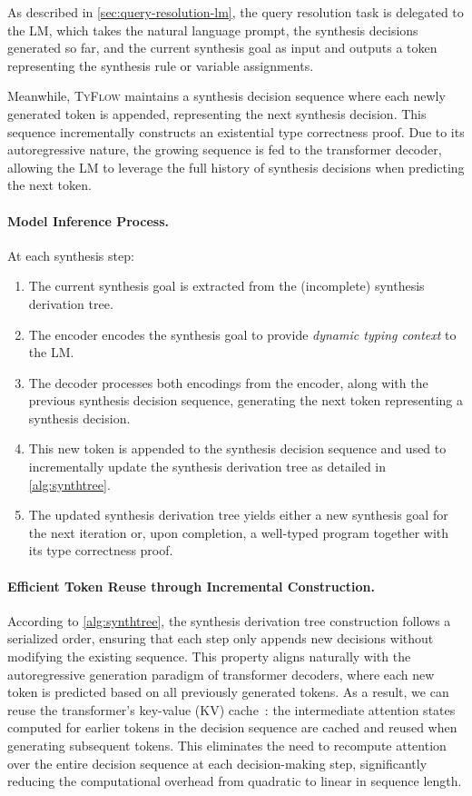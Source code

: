 \documentclass[manuscript,screen]{acmart}
\newcommand{\toolname}[1]{\textsc{#1}}
\newcommand{\mainname}{\toolname{TyFlow}\xspace}
\begin{document}
As described in \autoref{sec:query-resolution-lm}, the query resolution task is delegated to the LM, which takes the natural language prompt, the synthesis decisions generated so far, and the current synthesis goal as input and outputs a token representing the synthesis rule or variable assignments.

Meanwhile, \mainname maintains a synthesis decision sequence where each newly generated token is appended, representing the next synthesis decision. This sequence incrementally constructs an existential type correctness proof. Due to its autoregressive nature, the growing sequence is fed to the transformer decoder, allowing the LM to leverage the full history of synthesis decisions when predicting the next token.

\paragraph{Model Inference Process.}
At each synthesis step:
\begin{enumerate}
    \item The current synthesis goal is extracted from the (incomplete) synthesis derivation tree.
    \item The encoder encodes the synthesis goal to provide \emph{dynamic typing context} to the LM.
    \item The decoder processes both encodings from the encoder, along with the previous synthesis decision sequence, generating the next token representing a synthesis decision.
    \item This new token is appended to the synthesis decision sequence and used to incrementally update the synthesis derivation tree as detailed in  \autoref{alg:synthtree}.
    \item The updated synthesis derivation tree yields either a new synthesis goal for the next iteration or, upon completion, a well-typed program together with its type correctness proof.
\end{enumerate}

\paragraph{Efficient Token Reuse through Incremental Construction.}
According to \autoref{alg:synthtree}, the synthesis derivation tree construction follows a serialized order, ensuring that each step only appends new decisions without modifying the existing sequence.
This property aligns naturally with the autoregressive generation paradigm of transformer decoders, where each new token is predicted based on all previously generated tokens.
%
As a result, we can reuse the transformer's key-value (KV) cache~\cite{DBLP:conf/mlsys/PopeDCDBHXAD23}: the intermediate attention states computed for earlier tokens in the decision sequence are cached and reused when generating subsequent tokens. This eliminates the need to recompute attention over the entire decision sequence at each decision-making step, significantly reducing the computational overhead from quadratic to linear in sequence length.
\end{document}
